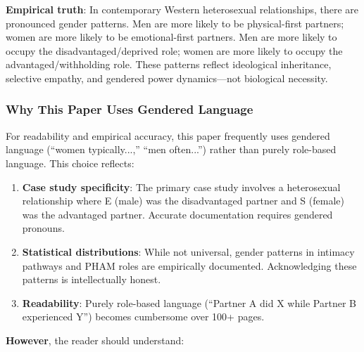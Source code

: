 \documentclass[12pt, letterpaper]{article}
\begin{document}
\textbf{Empirical truth}: In contemporary Western heterosexual relationships, there are pronounced gender patterns. Men are more likely to be physical-first partners; women are more likely to be emotional-first partners. Men are more likely to occupy the disadvantaged/deprived role; women are more likely to occupy the advantaged/withholding role. These patterns reflect ideological inheritance, selective empathy, and gendered power dynamics---not biological necessity.

\subsubsection{Why This Paper Uses Gendered Language}

For readability and empirical accuracy, this paper frequently uses gendered language (``women typically...,'' ``men often...'') rather than purely role-based language. This choice reflects:

\begin{enumerate}
    \item \textbf{Case study specificity}: The primary case study involves a heterosexual relationship where E (male) was the disadvantaged partner and S (female) was the advantaged partner. Accurate documentation requires gendered pronouns.
    
    \item \textbf{Statistical distributions}: While not universal, gender patterns in intimacy pathways and PHAM roles are empirically documented. Acknowledging these patterns is intellectually honest.
    
    \item \textbf{Readability}: Purely role-based language (``Partner A did X while Partner B experienced Y'') becomes cumbersome over 100+ pages.
\end{enumerate}

\textbf{However}, the reader should understand:
\end{document}
